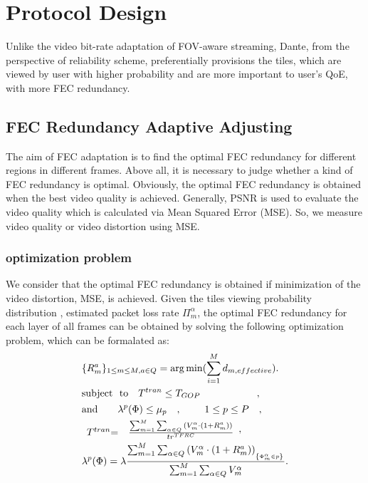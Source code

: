 
\section{Protocol Design}
Unlike the video bit-rate adaptation of FOV-aware streaming, Dante, from the perspective of reliability scheme, preferentially provisions the tiles, which are viewed by user with higher probability and are more important to user's QoE, with more FEC redundancy.  


\subsection{FEC Redundancy Adaptive Adjusting}
The aim of FEC adaptation is to find the optimal FEC redundancy for different regions in different frames. Above all, it is necessary to judge whether a kind of FEC redundancy is optimal. Obviously, the optimal FEC redundancy is obtained when the best video quality is achieved. Generally, PSNR is used to evaluate the video quality which is calculated via Mean Squared Error (MSE). So, we measure video quality or video distortion using MSE.


\subsubsection{optimization problem}

We consider that the optimal FEC redundancy is obtained if minimization of the video distortion, MSE, is achieved.
Given the tiles viewing probability distribution \cite{360ProbDASH}, estimated packet loss rate $\Pi _m^\alpha$, the optimal FEC redundancy for each layer of all frames can be obtained by solving the following optimization problem, which can be formalated as:
\begin{eqnarray}
&{\{ R_m^a\} _{1 \le m \le M,a \in Q}} = \arg \min (\sum\limits_{i = 1}^M {d_{m,effective}}).  \\
&{\rm{subject}}{~~\rm{to}}{~~~T^{tran}} \le {T_{GOP}}~~~~~~~~~~~~~~~~~, \\
&{\rm{and}}{~~~~~~\lambda ^p}(\Phi ) \le {\mu _p}\begin{array}{*{20}{c}}
{}
\end{array}{\rm{}},{\rm{}}~~~~~~~1 \le p \le P~~~,\\
&\begin{array}{*{20}{c}}
{{T^{tran}}{\rm{ = }}}&{\frac{{\sum\nolimits_{m = 1}^M {\sum\nolimits_{\alpha  \in Q} {(V_m^\alpha  \cdot (1 + R_m^a))} } }}{{t{r^{TFRC}}}}}
\end{array},\\
&{\lambda ^p}(\Phi ) = \lambda \frac{{\sum\nolimits_{m = 1}^M {\sum\nolimits_{\alpha  \in Q} {{{(V_m^\alpha  \cdot (1 + R_m^a))}_{_{\left\{ {\Phi _m^\alpha  \in p} \right\}}}}} } }}{{\sum\nolimits_{m = 1}^M {\sum\nolimits_{\alpha  \in Q} {V_m^\alpha } } }}.
\end{eqnarray}

